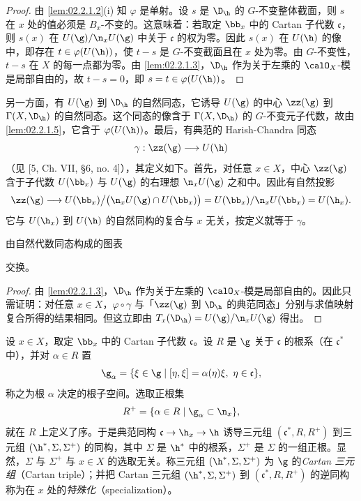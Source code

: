 \begin{proof}
由 \ref{lem:02.2.1.2}(i) 知 $\varphi$ 是单射。设 $s$ 是 $\D_\h$ 的 $G$-不变整体截面，则 $s$ 在 $x$ 处的值必须是 $B_x$-不变的。这意味着：若取定 $\bb_x$ 中的 Cartan 子代数 $\mathfrak{c}$，则 $s(x)$ 在 $U(\g)/\n_xU(\g)$ 中关于 $\mathfrak{c}$ 的权为零。因此 $s(x)$ 在 $U(\h)$ 的像中，即存在 $t\in\varphi(U(\h))$，使 $t-s$ 是 $G$-不变截面且在 $x$ 处为零。由 $G$-不变性，$t-s$ 在 $X$ 的每一点都为零。由 \ref{lem:02.2.1.3}，$\D_\h$ 作为关于左乘的 $\calO_X$-模是局部自由的，故 $t-s=0$，即 $s=t\in\varphi(U(\h))$。
\end{proof}

另一方面，有 $U(\g)$ 到 $\D_\h$ 的自然同态，它诱导 $U(\g)$ 的中心 $\zz(\g)$ 到 $\Gamma(X,\D_\h)$ 的自然同态。这个同态的像含于 $\Gamma(X,\D_\h)$ 的 $G$-不变元子代数，故由 \ref{lem:02.2.1.5}，它含于 $\varphi(U(\h))$。最后，有典范的 Harish-Chandra 同态
$$\gamma:\zz(\g)\longrightarrow U(\h)$$
（见 [5, Ch. VII, §6, no. 4]），其定义如下。首先，对任意 $x\in X$，中心 $\zz(\g)$ 含于子代数 $U(\bb_x)$ 与 $U(\g)$ 的右理想 $\n_xU(\g)$ 之和中。因此有自然投影
$$\zz(\g)\longrightarrow U(\bb_x)\big/\bigl(\n_xU(\g)\cap U(\bb_x)\bigr)=U(\bb_x)/\n_xU(\bb_x)=U(\h_x).$$
它与 $U(\h_x)$ 到 $U(\h)$ 的自然同构的复合与 $x$ 无关，按定义就等于 $\gamma$。

\begin{proposition}\label{prop:02.2.1.6}
由自然代数同态构成的图表
\begin{center}
\end{center}
交换。
\end{proposition}

\begin{proof}
由 \ref{lem:02.2.1.3}，$\D_\h$ 作为关于左乘的 $\calO_X$-模是局部自由的。因此只需证明：对任意 $x\in X$，$\varphi\circ\gamma$ 与「$\zz(\g)$ 到 $\D_\h$ 的典范同态」分别与求值映射复合所得的结果相同。但这立即由 $T_x(\D_\h)=U(\g)/\n_xU(\g)$ 得出。
\end{proof}

设 $x\in X$，取定 $\bb_x$ 中的 Cartan 子代数 $\mathfrak{c}$。设 $R$ 是 $\g$ 关于 $\mathfrak{c}$ 的根系（在 $\mathfrak{c}^*$ 中），并对 $\alpha\in R$ 置
$$\g_\alpha=\{\xi\in\g\mid [\eta,\xi]=\alpha(\eta)\xi,\ \eta\in\mathfrak{c}\},$$
称之为根 $\alpha$ 决定的根子空间。选取正根集
$$R^+=\{\alpha\in R\mid \g_\alpha\subset\n_x\},$$
就在 $R$ 上定义了序。于是典范同构 $\mathfrak{c}\to\h_x\to\h$ 诱导三元组 $(\mathfrak{c}^*,R,R^+)$ 到三元组 $(\h^*,\Sigma,\Sigma^+)$ 的同构，其中 $\Sigma$ 是 $\h^*$ 中的根系，$\Sigma^+$ 是 $\Sigma$ 的一组正根。显然，$\Sigma$ 与 $\Sigma^+$ 与 $x\in X$ 的选取无关。称三元组 $(\h^*,\Sigma,\Sigma^+)$ 为 $\g$ 的\emph{Cartan 三元组}（Cartan triple）；并把 Cartan 三元组 $(\h^*,\Sigma,\Sigma^+)$ 到 $(\mathfrak{c}^*,R,R^+)$ 的逆同构称为在 $x$ 处的\emph{特殊化}（specialization）。


